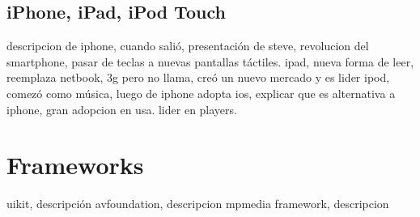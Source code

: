 		
		
		
		

	

		\subsection{iPhone, iPad, iPod Touch}
		descripcion de iphone, cuando salió, presentación de steve, revolucion del smartphone, pasar de teclas a nuevas pantallas táctiles.
		ipad, nueva forma de leer, reemplaza netbook, 3g pero no llama, creó un nuevo mercado y es lider
		ipod, comezó como música, luego de iphone adopta ios, explicar que es alternativa a iphone, gran adopcion en usa.  lider en players.
	\section{Frameworks}
	uikit, descripción 
	avfoundation, descripcion
	mpmedia framework, descripcion
	
